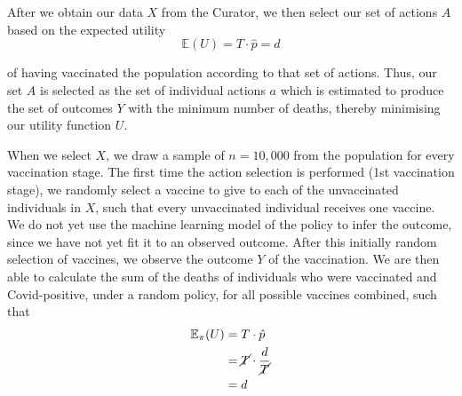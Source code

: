 \documentclass{article}
\begin{document}
After we obtain our data $X$ from the Curator, we then select our set of actions $A$ based on the expected utility 
\begin{equation}
\label{eq: expected utility}
    \mathbb{E}(U)=T \cdot \hat{p} = d
\end{equation}

\noindent of having vaccinated the population according to that set of actions. Thus, our set $A$ is selected as the set of individual actions $a$ which is estimated to produce the set of outcomes $Y$ with the minimum number of deaths, thereby minimising our utility function $U$.

When we select $X$, we draw a sample of $n = 10,000$ from the population for every vaccination stage. The first time the action selection is performed (1st vaccination stage), we randomly select a vaccine to give to each of the unvaccinated individuals in $X$, such that every unvaccinated individual receives one vaccine. We do not yet use the machine learning model of the policy to infer the outcome, since we have not yet fit it to an observed outcome. After this initially random selection of vaccines, we observe the outcome $Y$ of the vaccination. We are then able to calculate the sum of the deaths of individuals who were vaccinated and Covid-positive, under a random policy, for all possible vaccines combined, such that
\begin{equation}
\label{eq: expected utility 2}
    \begin{split}
        \mathbb{E}_\pi(U) &= T \cdot \hat{p}\\ 
        &= \cancel{T} \cdot \frac{d}{\cancel{T}}\\ 
        &= d\\
    \end{split}
\end{equation}
\end{document}
